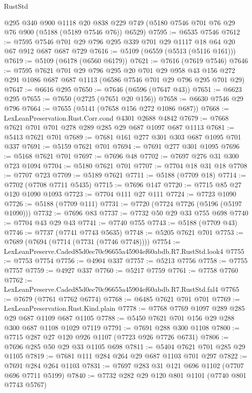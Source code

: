 \begin{lexlean}{RustStd}
\begin{coremodule}
    @295
    @340
    @900
    @1118
    @20
    @838
    @229
    @749
    (@5180 @7546 @701 @76 @29 @76 @900 (@5188 (@5189 @7546 @76)) @6529)
@7595 := @6535 @7546
@7612 := @7595 @7546 @701 @29 @796 @295 @339 @701 @29 @1117 @18 @64 @20 @67 @912 @687 @687 @729
@7616 := @5109 (@6559 (@5513 (@5116 @161)))
@7619 := @5109 (@6178 (@6560 @6179))
@7621 := @7616 (@7619 @7546)
@7646 := @7595
    @7621
    @701
    @29
    @796
    @295
    @20
    @701
    @29
    @958
    @43
    @156
    @272
    @291
    @1086
    @687
    @687
    @1113
    (@6586 @7546 @701 @29 @796 @295 @701 @29)
@7647 := @6616 @295
@7650 := @7646 (@6596 (@7647 @43))
@7651 := @6623 @295
@7655 := @7650 (@2725 (@7651 @20 @156))
@7658 := @6630 @7546 @29 @796
@7664 := @7655 (@5141 (@7658 @156 @272 @1086 @687))
@7668 := LexLeanPreservation.Rust.Corr.cond @4301 @2688 @4842
@7679 := @7668 @7621 @701 @701 @278 @289 @285 @29 @687 @1097 @687 @1113
@7681 := @5413 @7621 @701
@7689 := @7681 @161 @277 @301 @303 @687 @1095 @701 @337
@7691 := @5159 @7621 @701
@7694 := @7691 @277 @301 @1095
@7696 := @5168 @7621 @701
@7697 := @7696 @48
@7702 := @7697 @276 @31 @300 @723 @1094
@7704 := @5180 @7621 @701
@7707 := @7704 @18 @31 @18
@7708 := @7707 @723
@7709 := @5189 @7621
@7711 := @5188 (@7709 @18)
@7714 := @7702 (@7708 @7711 @5435)
@7715 := @7696 @147
@7720 := @7715 @85 @27 @120 @1090 @1093
@7723 := @7704 @111 @27 @111
@7724 := @7723 @1090
@7726 := @5188 (@7709 @111)
@7731 := @7720 (@7724 @7726 (@5196 (@5197 @1090)))
@7732 := @7696 @83
@7737 := @7732 @50 @29 @33 @755 @698
@7740 := @7704 @43 @29 @43
@7741 := @7740 @755
@7743 := @5188 (@7709 @43)
@7746 := @7737 (@7741 @7743 @5635)
@7748 := @5205 @7621 @701
@7753 := @7689 (@7694 (@7714 (@7731 (@7746 @7748))))
@7754 := LexLeanPreserve.Caded85d0ec70c96655a45904ef60abdb.R7.RustStd.look4
@7755 := @7753 @7754
@7756 := @4904 @337
@7757 := @5213 @7756
@7758 := @7755 @7757
@7759 := @4927 @337
@7760 := @5217 @7759
@7761 := @7758 @7760
@7762 := LexLeanPreserve.Caded85d0ec70c96655a45904ef60abdb.R7.RustStd.fal4
@7765 := @7679 (@7761 @7762 @6774)
@7768 := @6485 @7621 @701 @701
@7769 := LexLeanPreservation.Rust.Kind.plain
@7778 := @7768 @7769 @1097 @289 @285 @29 @687 @1109 @687 @1105
@7788 := @5450 @7621 @701 @156 @29 @288 @300 @687 @1108 @1029 @7119
@7791 := @7691 @288 @300 @1108
@7800 := @7715 @287 @27 @120 @926 @1107 (@7723 @926 @7726 @6731)
@7806 := @7696 @285 @50 @29 @33 @1105 @698
@7811 := @5404 @7621 @701 @285 @29 @1105
@7819 := @7681 @111 @284 @264 @29 @687 @1103 @701 @297
@7822 := @7691 @284 @264 @1103
@7831 := @7697 @283 @31 @121 @696 @1102 (@7707 @696 @7711 @5199)
@7840 := @7732 @282 @29 @120 @801 @1101 (@7740 @801 @7743 @5767)

\end{coremodule}
\end{lexlean}
